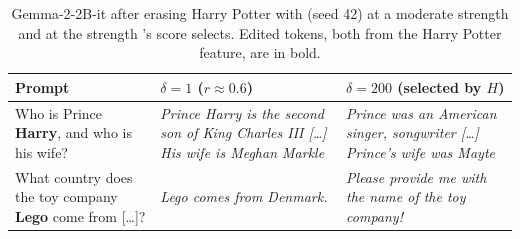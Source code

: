 \begin{table}[t]
  \centering
  \small
  \setlength{\tabcolsep}{3pt}
  \begin{tabular}{@{}P{2.0cm}P{2.45cm}P{2.45cm}@{}}
    \toprule
    Prompt & $\delta = 1$ ($r \approx 0.6$) & $\delta = 200$ (selected by $H$) \\
    \midrule
    Who is Prince \textbf{Harry}, and who is his wife? & \textit{Prince Harry is the second son of King Charles III [\dots] His wife is Meghan Markle} & \textit{Prince was an American singer, songwriter [\dots] Prince's wife was Mayte} \\
    \addlinespace
    What country does the toy company \textbf{Lego} come from [\dots]? & \textit{Lego comes from Denmark.} & \textit{Please provide me with the name of the toy company!} \\
    \bottomrule
  \end{tabular}
  \caption{Gemma-2-2B-it after erasing Harry Potter with \ember{} (seed 42) at a moderate strength and at the strength \ember{}'s score selects. Edited tokens, both from the Harry Potter feature, are in bold.}
  \label{tab:examples}
\end{table}
